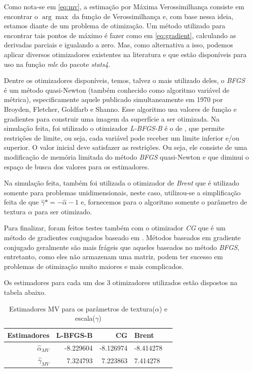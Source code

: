 \documentclass[12pt]{article}
\begin{document}
Como nota-se em \eqref{eq:mv}, a estimação por Máxima Verossimilhança consiste em encontrar o $\arg\max$ da função de Verossimilhança e, com base nessa ideia, estamos diante de um problema de otimização. Um método utilizado para encontrar tais pontos de máximo é fazer como em \eqref{eq:gradient}, calculando as derivadas parciais e igualando a zero. Mas, como alternativa a isso, podemos aplicar diversos otimizadores existentes na literatura e que estão disponíveis para uso na função \textit{mle} do pacote \textit{stats4}.

Dentre os otimizadores disponíveis, temos, talvez o mais utilizado deles, o \emph{BFGS} é um método quasi-Newton (também conhecido como algoritmo variável de métrica), especificamente aquele publicado simultaneamente em 1970 por Broyden, Fletcher, Goldfarb e Shanno. Esse algoritmo usa valores de função e gradientes para construir uma imagem da superfície a ser otimizada. Na simulação feita, foi utilizado o otimizador \emph{L-BFGS-B} é o de \citet{Byrd_1995}, que permite restrições de limite, ou seja, cada variável pode receber um limite inferior e/ou superior. O valor inicial deve satisfazer as restrições. Ou seja, ele consiste de uma modificação de memória limitada do método \emph{BFGS} quasi-Newton e que diminui o espaço de busca dos valores para os estimadores.

Na simulação feita, também foi utilizada o otimizador de \emph{Brent} que é utilizado somente para problemas unidimensionais, neste caso, utilizou-se a simplificação feita de que $\widehat{\gamma}* = -\widehat{\alpha} - 1$ e, fornecemos para o algoritmo somente o parâmetro de textura $\alpha$ para ser otimizado.

Para finalizar, foram feitos testes também com o otimizador \emph{CG} que é um método de gradientes conjugados baseado em \citet{Fletcher64}. Métodos baseados em gradiente conjugado geralmente são mais frágeis que aqueles baseados no método \emph{BFGS}, entretanto, como eles não armazenam uma matriz, podem ter sucesso em problemas de otimização muito maiores e mais complicados. 

Os estimadores para cada um dos 3 otimizadores utilizados estão dispostos na tabela abaixo.
\begin{table}[H]
\centering
\caption{Estimadores MV para os parâmetros de textura($\alpha$) e escala($\gamma$)}
\vspace{0.2cm}
\begin{tabular}{r|r|r|lr}
\hline
Estimadores & L-BFGS-B & CG & Brent \\ 
\hline                               
$\widehat{\alpha}_{MV}$ & -8.229604 & -8.126974 & -8.414278 \\
$\widehat{\gamma}_{MV}$ & 7.324793 & 7.223863 & 7.414278 \\
\end{tabular}
\end{table}
\end{document}
